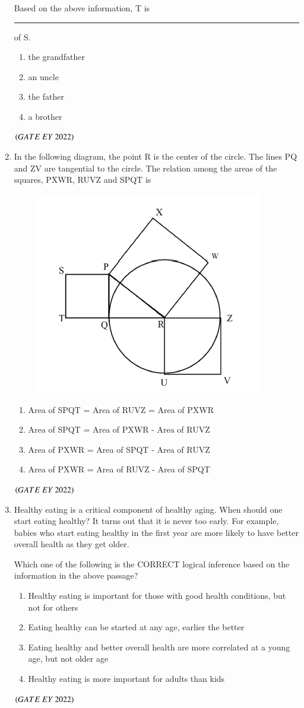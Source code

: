 \documentclass[journal]{IEEEtran}
\numberwithin{equation}{enumi}
\numberwithin{figure}{enumi}
\begin{document}
\begin{enumerate}
Based on the above information, T is \rule{3cm}{0.15mm} of S.
    \begin{enumerate}
        \item  the grandfather
        \item  an uncle
        \item  the father
        \item  a brother
    \end{enumerate}
    \hfill{$\brak{ GATE\ EY\ 2022}$}
    \bigskip
     \item In the following diagram, the point R is the center of the circle. The lines PQ
and ZV are tangential to the circle. The relation among the areas of the squares,
PXWR, RUVZ and SPQT is
\begin{figure}[H]
    \centering
\includegraphics[width=0.5\columnwidth]{figs/1.png}
    \caption{}
    \label{fig:1}
   \end{figure}
    \begin{enumerate}
        \item  Area of SPQT = Area of RUVZ = Area of PXWR
        \item  Area of SPQT = Area of PXWR - Area of RUVZ
        \item  Area of PXWR = Area of SPQT - Area of RUVZ
        \item  Area of PXWR = Area of RUVZ - Area of SPQT
    \end{enumerate}
    \hfill{$\brak{ GATE\ EY\ 2022}$}
    \bigskip
         \item 
         Healthy eating is a critical component of healthy aging. When should one start
eating healthy? It turns out that it is never too early. For example, babies who
start eating healthy in the first year are more likely to have better overall health
as they get older.

Which one of the following is the CORRECT logical inference based on the
information in the above passage?
    \begin{enumerate}
        \item  Healthy eating is important for those with good health conditions, but not for
others
        \item  Eating healthy can be started at any age, earlier the better
        \item  Eating healthy and better overall health are more correlated at a young age, but
not older age
        \item  Healthy eating is more important for adults than kids
    \end{enumerate}
    \hfill{$\brak{ GATE\ EY\ 2022}$}
    \bigskip
    

\end{enumerate}
\end{document}
